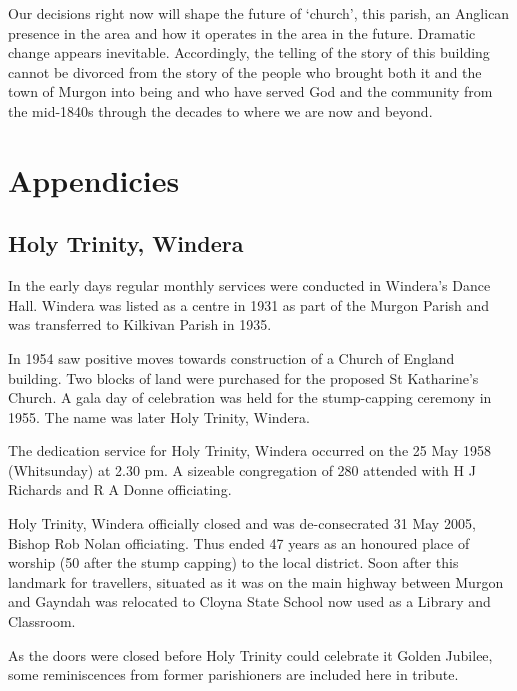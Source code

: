 Our decisions right now will shape the future of `church', this parish, an Anglican presence in the area and how it operates in the area in the future. Dramatic change appears inevitable. Accordingly, the telling of the story of this building cannot be divorced from the story of the people who brought both it and the town of Murgon into being and who have served God and the community from the mid-1840s through the decades to where we are now and beyond.

\balance


\backmatter
\chapter{Appendicies}
\nobalance


\section{Holy Trinity, Windera}



In the early days regular monthly services were conducted in Windera's Dance Hall. Windera was listed as a centre in 1931 as part of the Murgon Parish and was transferred to Kilkivan Parish in 1935.



In 1954 saw positive moves towards construction of a Church of England building. Two blocks of land were purchased for the proposed St Katharine's Church. A gala day of celebration was held for the stump-capping ceremony in 1955. The name was later Holy Trinity, Windera.



The dedication service for Holy Trinity, Windera occurred on the 25 May 1958 (Whitsunday) at 2.30 pm. A sizeable congregation of 280 attended with H J Richards and R A Donne officiating.



Holy Trinity, Windera officially closed and was de-consecrated 31 May 2005, Bishop Rob Nolan officiating. Thus ended 47 years as an honoured place of worship (50 after the stump capping) to the local district. Soon after this landmark for travellers, situated as it was on the main highway between Murgon and Gayndah was relocated to Cloyna State School now used as a Library and Classroom.



As the doors were closed before Holy Trinity could celebrate it Golden Jubilee, some reminiscences from former parishioners are included here in tribute.



